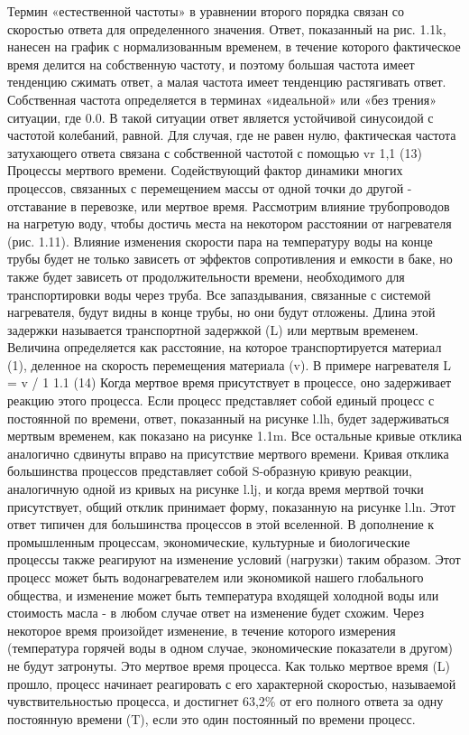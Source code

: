 \documentclass[aps,
12pt,
final,
oneside,
onecolumn,
musixtex, 
superscriptaddress,
centertags]{article}
\begin{document}
Термин «естественной частоты» в уравнении второго порядка связан со скоростью ответа для определенного значения. Ответ, показанный на рис. 1.1k, нанесен на график с нормализованным временем, в течение которого фактическое время делится на собственную частоту, и поэтому большая частота имеет тенденцию сжимать ответ, а малая частота имеет тенденцию растягивать ответ. Собственная частота определяется в терминах «идеальной» или «без трения» ситуации, где 0.0. В такой ситуации ответ является устойчивой синусоидой с частотой колебаний, равной. Для случая, где не равен нулю, фактическая частота затухающего ответа связана с собственной частотой с помощью vr 1,1 (13) Процессы мертвого времени. Содействующий фактор динамики многих процессов, связанных с перемещением массы от одной точки до другой - отставание в перевозке, или мертвое время. Рассмотрим влияние трубопроводов на нагретую воду, чтобы достичь места на некотором расстоянии от нагревателя (рис. 1.11). Влияние изменения скорости пара на температуру воды на конце трубы будет не только зависеть от эффектов сопротивления и емкости в баке, но также будет зависеть от продолжительности времени, необходимого для транспортировки воды через труба. Все запаздывания, связанные с системой нагревателя, будут видны в конце трубы, но они будут отложены. Длина этой задержки называется транспортной задержкой (L) или мертвым временем. Величина определяется как расстояние, на которое транспортируется материал (1), деленное на скорость перемещения материала (v). В примере нагревателя L = v / 1 1.1 (14) Когда мертвое время присутствует в процессе, оно задерживает реакцию этого процесса. Если процесс представляет собой единый процесс с постоянной по времени, ответ, показанный на рисунке l.lh, будет задерживаться мертвым временем, как показано на рисунке 1.1m. Все остальные кривые отклика аналогично сдвинуты вправо на присутствие мертвого времени. Кривая отклика большинства процессов представляет собой S-образную кривую реакции, аналогичную одной из кривых на рисунке l.lj, и когда время мертвой точки присутствует, общий отклик принимает форму, показанную на рисунке l.ln.
Этот ответ типичен для большинства процессов в этой вселенной. В дополнение к промышленным процессам, экономические, культурные и биологические процессы также реагируют на изменение условий (нагрузки) таким образом. Этот процесс может быть водонагревателем или экономикой нашего глобального общества, и изменение может быть
температура входящей холодной воды или стоимость масла - в любом случае ответ на изменение будет схожим. Через некоторое время произойдет изменение, в течение которого измерения (температура горячей воды в одном случае, экономические показатели в другом) не будут затронуты. Это мертвое время процесса. Как только мертвое время (L) прошло, процесс начинает реагировать с его характерной скоростью, называемой чувствительностью процесса, и достигнет 63,2\% от его полного ответа за одну постоянную времени (T), если это один постоянный по времени процесс.
\end{document}
